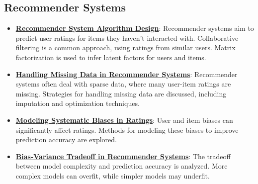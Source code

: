 \documentclass{article}%
\begin{document}
\subsection{Recommender Systems}%
\label{subsec:RecommenderSystems}%
\begin{itemize}[leftmargin=*]%
\item \href{https://purdue.brightspace.com/d2l/common/assets/pdfjs-d2l-dist/1.0.14-legacy/web/viewer.html?file=\%2Fcontent\%2Fenforced\%2F1095467-wl.202510.CS.24300.001\%2F11L2-svd-pca-recommender.pdf\%3Fou\%3D1095467\&lang=en-us\&container=d2l-fileviewer-rendered-pdf\&fullscreen=d2l-fileviewer-rendered-pdf-dialog\&height=667#page=31}{\textbf{Recommender System Algorithm Design}}: Recommender systems aim to predict user ratings for items they haven't interacted with. Collaborative filtering is a common approach, using ratings from similar users. Matrix factorization is used to infer latent factors for users and items.%
\item \href{https://purdue.brightspace.com/d2l/common/assets/pdfjs-d2l-dist/1.0.14-legacy/web/viewer.html?file=\%2Fcontent\%2Fenforced\%2F1095467-wl.202510.CS.24300.001\%2F11L2-svd-pca-recommender.pdf\%3Fou\%3D1095467\&lang=en-us\&container=d2l-fileviewer-rendered-pdf\&fullscreen=d2l-fileviewer-rendered-pdf-dialog\&height=667#page=38}{\textbf{Handling Missing Data in Recommender Systems}}: Recommender systems often deal with sparse data, where many user-item ratings are missing. Strategies for handling missing data are discussed, including imputation and optimization techniques.%
\item \href{https://purdue.brightspace.com/d2l/common/assets/pdfjs-d2l-dist/1.0.14-legacy/web/viewer.html?file=\%2Fcontent\%2Fenforced\%2F1095467-wl.202510.CS.24300.001\%2F11L2-svd-pca-recommender.pdf\%3Fou\%3D1095467\&lang=en-us\&container=d2l-fileviewer-rendered-pdf\&fullscreen=d2l-fileviewer-rendered-pdf-dialog\&height=667#page=40}{\textbf{Modeling Systematic Biases in Ratings}}: User and item biases can significantly affect ratings. Methods for modeling these biases to improve prediction accuracy are explored.%
\item \href{https://purdue.brightspace.com/d2l/common/assets/pdfjs-d2l-dist/1.0.14-legacy/web/viewer.html?file=\%2Fcontent\%2Fenforced\%2F1095467-wl.202510.CS.24300.001\%2F11L2-svd-pca-recommender.pdf\%3Fou\%3D1095467\&lang=en-us\&container=d2l-fileviewer-rendered-pdf\&fullscreen=d2l-fileviewer-rendered-pdf-dialog\&height=667#page=53}{\textbf{Bias-Variance Tradeoff in Recommender Systems}}: The tradeoff between model complexity and prediction accuracy is analyzed. More complex models can overfit, while simpler models may underfit.%
\end{itemize}
\end{document}
